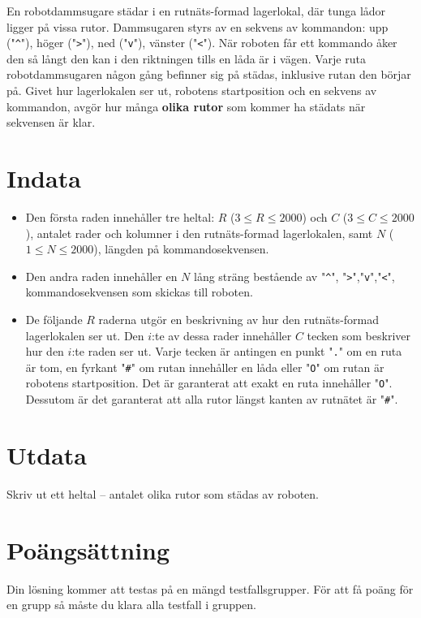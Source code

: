 
En robotdammsugare städar i en rutnäts-formad lagerlokal, där tunga lådor ligger på vissa rutor. Dammsugaren styrs av en sekvens av kommandon: upp ("\verb|^|"), höger ("\verb|>|"), ned ("\verb|v|"), vänster ("\verb|<|"). 
När roboten får ett kommando åker den så långt den kan i den riktningen tills en låda är i vägen. Varje ruta robotdammsugaren någon gång befinner sig på städas, inklusive rutan den börjar på. Givet hur lagerlokalen ser ut, robotens startposition och en sekvens av kommandon, avgör hur många \textbf{olika rutor} som kommer ha städats när sekvensen är klar.

\section*{Indata}
\begin{itemize}
  \item
    Den första raden innehåller tre heltal: $R$ ($3 \le R \le 2000$) och $C$ ($3 \le C \le 2000$),
    antalet rader och kolumner i den rutnäts-formad lagerlokalen, samt $N$ ($1 \le N \le 2000$), längden på kommandosekvensen.

  \item
    Den andra raden innehåller en $N$ lång sträng bestående av "\verb|^|", "\verb|>|","\verb|v|","\verb|<|", kommandosekvensen som skickas till roboten.

  \item
    De följande $R$ raderna utgör en beskrivning av hur den rutnäts-formad lagerlokalen ser ut.
    Den $i$:te av dessa rader innehåller $C$ tecken som beskriver hur den $i$:te raden ser ut.
    Varje tecken är antingen en punkt "\verb|.|" om en ruta är tom, en fyrkant "\verb|#|" om rutan innehåller en låda eller "\verb|O|" om rutan är robotens startposition. Det är garanterat att exakt en ruta innehåller "\verb|O|". Dessutom är det garanterat att alla rutor längst kanten av rutnätet är "\verb|#|".
\end{itemize}

\section*{Utdata}
Skriv ut ett heltal -- antalet olika rutor som städas av roboten.

\section*{Poängsättning}
Din lösning kommer att testas på en mängd testfallsgrupper.
För att få poäng för en grupp så måste du klara alla testfall i gruppen.

